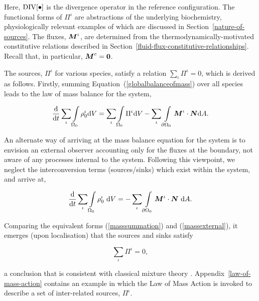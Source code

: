 \noindent Here, $\mathrm{\small{DIV}[\bullet]}$ is the divergence
operator in the reference configuration. The functional forms of
$\Pi^\iota$ are abstractions of the underlying biochemistry,
physiologically relevant examples of which are discussed in
Section~\ref{nature-of-sources}. The fluxes, $\mbox{\boldmath$ M$}^\iota$, are
determined from the thermodynamically-motivated constitutive relations
described in
Section~\ref{fluid-flux-constitutive-relationships}. Recall that, in
particular, $\mbox{\boldmath$ M$}^{c} = {\bf 0}$.

The sources, $\Pi^\iota$ for various species, satisfy a relation
$\sum\limits_\iota\Pi^\iota = 0$, which is derived as
follows. Firstly, summing Equation~(\ref{globalbalanceofmass}) over all
species leads to the law of mass balance for the system,

\begin{equation}
\frac{\mathrm{d}}{\mathrm{d}t} \sum\limits_\iota\int\limits_{\Omega_0}
\rho_0^\iota \mathrm{d}V = \sum\limits_\iota 
\int\limits_{\Omega_0} \Pi^\iota \mathrm{d}V
- \sum\limits_\iota \int\limits_{\partial\Omega_0}\mbox{\boldmath$ M$}^\iota\cdot\mbox{\boldmath$ N$} \mathrm{d}A.
\label{masssummation}
\end{equation}

\noindent An alternate way of arriving at the mass balance equation
for the system is to envision an external observer accounting only for
the fluxes at the boundary, not aware of any processes internal to the
system. Following this viewpoint, we neglect the interconversion terms
(sources/sinks) which exist within the system, and arrive at,

\begin{equation}
\frac{\mathrm{d}}{\mathrm{d}t}\sum\limits_\iota\int\limits_{\Omega_0}\rho_0^\iota
\ \mathrm{d}V =
-\sum\limits_\iota\int\limits_{\partial\Omega_0}\mbox{\boldmath$ M$}^\iota\cdot\mbox{\boldmath$ N$}
\ \mathrm{d}A.
\label{massexternal}
\end{equation}

\noindent Comparing the equivalent forms (\ref{masssummation})
and (\ref{massexternal}), it emerges (upon localisation) that the
sources and sinks satisfy

\begin{equation}
\sum\limits_\iota\Pi^\iota = 0,
\label{masssummationresult}
\end{equation}

\noindent a conclusion that is consistent with classical mixture
theory \citep{TruesdellNoll:65}. Appendix~\ref{law-of-mass-action}
contains an example in which the Law of Mass Action is invoked to
describe a set of inter-related sources, $\Pi^\iota$.

